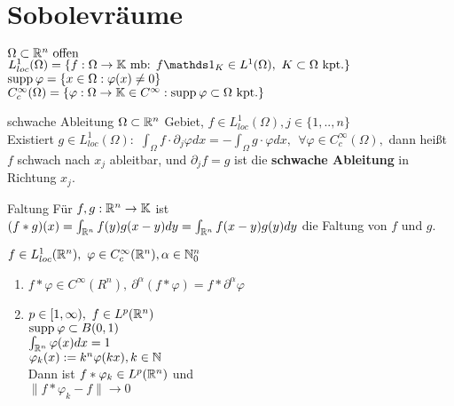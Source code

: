 \section{Sobolevräume}

\(\Omega \subset \mathbb{R}^n \text{ offen}\)\\
\(L_{loc}^1(\Omega) = \{f:\Omega \to \KK \text{ mb: }
f\indicator_K \in L^1(\Omega),\ K\subset \Omega \text{ kpt.}\}\) \\
\(\text{supp\hspace{0.2em}}\varphi = \{x\in \Omega: \varphi(x) \neq 0\}\)\\
\(C_c^\infty(\Omega)=\{\varphi:\Omega \to \mathbb{K} \in C^\infty: 
\text{supp\hspace{0.2em}}\varphi\subset\Omega \text{ kpt.}\}\)\\

\begin{definition}{schwache Ableitung}
    \(\Omega \subset \mathbb{R}^n\) Gebiet,
    \(f\in L^1_{loc}(\Omega), j\in \{1,..,n\}\)\\
    Existiert \(g \in L^1_{loc}(\Omega):\)
    \(
        \int_\Omega f\cdot \partial_j\varphi dx =
         - \int_\Omega g\cdot \varphi dx, \ \ 
         \forall \varphi\in C_c^{\infty}(\Omega),
    \)
    dann heißt \(f\) schwach nach \(x_j\) ableitbar, und \(\partial_jf=g\) ist
    die \textbf{schwache Ableitung} in Richtung \(x_j\).

\end{definition}

\begin{definition}{Faltung}
    Für \(f,g:\mathbb{R}^n \to \mathbb{K}\) ist
    \(
        (f\ast g )(x) = \int_{\mathbb{R}^n}f(y)g(x-y)dy
        = \int_{\mathbb{R}^n}f(x-y)g(y)dy
    \) 
    die Faltung von \(f\) und \(g\).
\end{definition}

\begin{lemma}
    \(f\in L_{loc}^1(\mathbb{R}^n),\ \varphi\in C_c^{\infty}(\mathbb{R}^n), 
    \alpha \in \mathbb{N}_0^n\)
    \begin{enumerate}[label = (\roman*)]
        \item \(f\ast \varphi \in C^\infty(R^n),\ 
            \partial^\alpha(f\ast \varphi) = f\ast \partial^\alpha\varphi\)
        \item \(p\in [1,\infty),\ f\in L^p(\mathbb{R}^n)\)\\
            \(\text{supp\hspace{0.2em}}\varphi \subset B(0,1)\)\\
            \(\int_{\mathbb{R}^n}\varphi(x)dx = 1\)\\
            \(\varphi_k(x):=k^n\varphi(kx), k\in\mathbb{N}\)\\
            Dann ist \(f\ast \varphi_k \in L^p(\mathbb{R}^n)\) und\\
            \(\|f\ast \varphi_k -f\|\to 0\)
    \end{enumerate}
\end{lemma}

